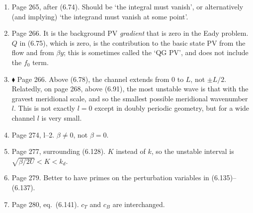 \documentclass[10pt]{article}
\newcommand{\eq}{eq.\ } \newcommand{\Eq}{Eq.\ }
\renewcommand{\star}{\ensuremath{\blacklozenge} }
\begin{document}
\begin{enumerate}
\item Page 265, after (6.74). Should be `the integral must vanish', or alternatively (and implying) `the integrand must vanish at some point'. 


\item Page 266. It is the background PV \emph{gradient} that is zero in the Eady problem. $Q$ in (6.75), which is zero, is the contribution to the basic state PV from the flow and from $\beta y$; this is sometimes called the `QG PV', and does not include the $f_0$ term. 

\item \star \label{channel} Page 266. Above (6.78), the channel extends from $0$ to $L$, not $\pm L/2$. Relatedly, on page 268, above (6.91), the most unstable wave is that with the gravest meridional scale, and so the smallest possible meridional wavenumber $l$. This is not exactly $l=0$ except in doubly periodic geometry, but for a wide channel $l$ is very small.



\item Page 274, l--2. $\beta \neq 0$, not $\beta = 0$. 

\item Page 277, surrounding (6.128). $K$ instead of $k$, so the unstable interval is $\sqrt{\beta/2U} < K < k_d$.



\item Page 279. Better to have primes on the perturbation variables in (6.135)--(6.137). 

\item Page 280, \eq (6.141). $c_T$ and $c_B$ are interchanged.


\end{enumerate}
\end{document}
